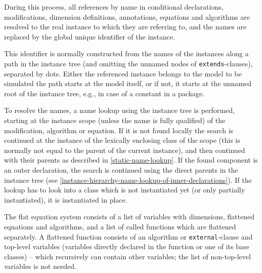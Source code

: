 During this process, all references by name in conditional declarations, modifications, dimension definitions, annotations, equations and algorithms are resolved to the real instance to which they are referring to, and the names are replaced by the global unique identifier of the instance.

\begin{nonnormative}
This identifier is normally constructed from the names of the instances along a path in the instance tree (and omitting the unnamed nodes of \lstinline!extends!-clauses), separated by dots.
Either the referenced instance belongs to the model to be simulated the path starts at the model itself, or if not, it starts at the unnamed root of the instance tree, e.g., in case of a constant in a package.
\end{nonnormative}

\begin{nonnormative}
To resolve the names, a name lookup using the instance tree is performed, starting at the instance scope (unless the name is fully qualified) of the modification, algorithm or equation.
If it is not found locally the search is continued at the instance of the lexically enclosing class of the scope (this is normally not equal to the parent of the current instance), and then continued with their parents as described in \cref{static-name-lookup}.
If the found component is an outer declaration, the search is continued using the direct parents in the instance tree (see \cref{instance-hierarchy-name-lookup-of-inner-declarations}).
If the lookup has to look into a class which is not instantiated yet (or only partially instantiated), it is instantiated in place.
\end{nonnormative}

The flat equation system consists of a list of variables with dimensions, flattened equations and algorithms, and a list of called functions which are flattened separately.
A flattened function consists of an algorithm or \lstinline!external!-clause and top-level variables (variables directly declared in the function or one of its base classes) -- which recursively can contain other variables; the list of non-top-level variables is not needed.

